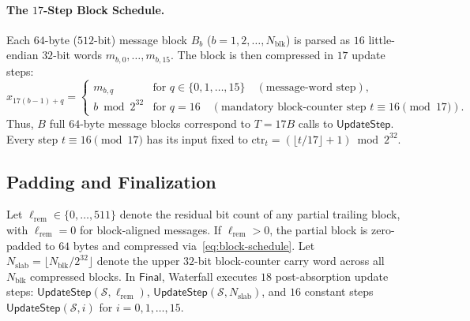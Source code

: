 \documentclass[11pt,a4paper]{article}
\theoremstyle{definition}
\theoremstyle{remark}
\newcommand{\UpdateStep}{\mathsf{UpdateStep}}
\begin{document}
\paragraph{The $17$-Step Block Schedule.}
Each $64$-byte ($512$-bit) message block $B_b$ ($b = 1, 2, \dots, N_{\mathrm{blk}}$) is parsed as $16$ little-endian $32$-bit words $m_{b,0}, \dots, m_{b,15}$. The block is then compressed in $17$ update steps:
\begin{equation}
\label{eq:block-schedule}
x_{17(b-1) + q} = \begin{cases}
m_{b, q} & \text{for } q \in \{0, 1, \dots, 15\} \quad (\text{message-word step}), \\
b \bmod 2^{32} & \text{for } q = 16 \quad (\text{mandatory block-counter step } t \equiv 16 \pmod{17}).
\end{cases}
\end{equation}
Thus, $B$ full $64$-byte message blocks correspond to $T = 17 B$ calls to $\UpdateStep$. Every step $t \equiv 16 \pmod{17}$ has its input fixed to $\mathrm{ctr}_t = (\lfloor t / 17 \rfloor + 1) \bmod 2^{32}$.

\subsection{Padding and Finalization}
Let $\ell_{\mathrm{rem}} \in \{0, \dots, 511\}$ denote the residual bit count of any partial trailing block, with $\ell_{\mathrm{rem}} = 0$ for block-aligned messages. If $\ell_{\mathrm{rem}} > 0$, the partial block is zero-padded to $64$ bytes and compressed via~\eqref{eq:block-schedule}. Let $N_{\mathrm{slab}} = \lfloor N_{\mathrm{blk}} / 2^{32} \rfloor$ denote the upper $32$-bit block-counter carry word across all $N_{\mathrm{blk}}$ compressed blocks. In $\mathsf{Final}$, Waterfall executes $18$ post-absorption update steps: $\UpdateStep(\mathcal{S}, \ell_{\mathrm{rem}})$, $\UpdateStep(\mathcal{S}, N_{\mathrm{slab}})$, and $16$ constant steps $\UpdateStep(\mathcal{S}, i)$ for $i = 0, 1, \dots, 15$.
\end{document}
